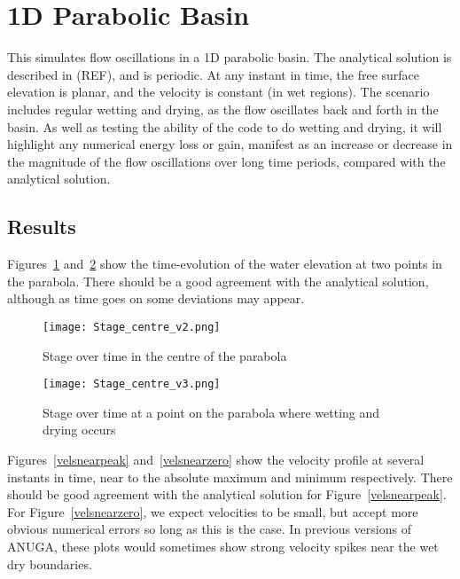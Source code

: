 \section{1D Parabolic Basin}
This simulates flow oscillations in a 1D parabolic basin. The analytical solution is described in (REF), and is periodic. At any instant in time, the free surface elevation is planar, and the velocity is constant (in wet regions). The scenario includes regular wetting and drying, as the flow oscillates back and forth in the basin. As well as testing the ability of the code to do wetting and drying, it will highlight any numerical energy loss or gain, manifest as an increase or decrease in the magnitude of the flow oscillations over long time periods, compared with the analytical solution. 

\subsection{Results}
Figures~\ref{stagecent} and~\ref{stagewd} show the time-evolution of the water elevation at two points in the parabola. There should be a good agreement with the analytical solution, although as time goes on some deviations may appear.  

\begin{figure}[h]
\begin{center}
\texttt{[image: Stage\_centre\_v2.png]}
\caption{Stage over time in the centre of the parabola}
\label{stagecent}
\end{center}
\end{figure}

\begin{figure}[h]
\begin{center}
\texttt{[image: Stage\_centre\_v3.png]}
\caption{Stage over time at a point on the parabola where wetting and drying occurs}
\label{stagewd}
\end{center}
\end{figure}

Figures~\ref{velsnearpeak} and~\ref{velsnearzero} show the velocity profile at several instants in time, near to the absolute maximum and minimum respectively. There should be good agreement with the analytical solution for Figure~\ref{velsnearpeak}. For Figure~\ref{velsnearzero}, we expect velocities to be small, but accept more obvious numerical errors so long as this is the case. In previous versions of ANUGA, these plots would sometimes show strong velocity spikes near the wet dry boundaries. 

